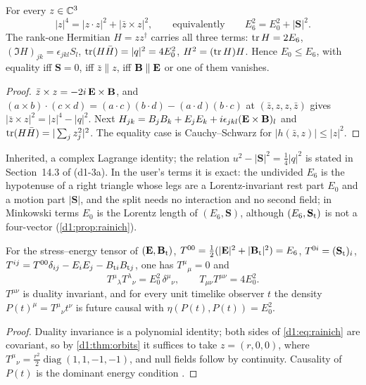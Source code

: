 \begin{proposition}[Differentiation]
\label{d1:prop:lagrange}
For every $z\in\mathbb{C}^3$
\begin{equation}
\label{d1:eq:split}
|z|^4=|z\cdot z|^2+|\bar z\times z|^2,\qquad\text{equivalently}\qquad E_6^2=E_0^2+|\mathbf S|^2 .
\end{equation}
The rank-one Hermitian $H=zz^\dagger$ carries all three terms: $\operatorname{tr} H=2E_6$, $(\Im H)_{jk}=\epsilon_{jkl}S_l$, $\operatorname{tr}(H\bar H)=|q|^2=4E_0^2$, $H^2=(\operatorname{tr} H)H$.
Hence $E_0\le E_6$, with equality iff $\mathbf S=0$, iff $\bar z\parallel z$, iff $\mathbf B\parallel\mathbf E$ or one of them vanishes.
\end{proposition}

\begin{proof}
$\bar z\times z=-2i\,\mathbf E\times\mathbf B$, and $(a\times b)\cdot(c\times d)=(a\cdot c)(b\cdot d)-(a\cdot d)(b\cdot c)$ at $(\bar z,z,z,\bar z)$ gives
$|\bar z\times z|^2=|z|^4-|q|^2$. Next $H_{jk}=B_jB_k+E_jE_k+i\epsilon_{jkl}(\mathbf E\times\mathbf B)_l$ and $\operatorname{tr}(H\bar H)=|\sum_jz_j^2|^2$. The equality case is
Cauchy--Schwarz for $|h(\bar z,z)|\le|z|^2$.
\end{proof}

Inherited, a complex Lagrange identity; the relation $u^2-|\mathbf S|^2=\tfrac14|q|^2$ is stated in Section~14.3 of \cite{ES17} (d1-3a). In the user's
terms it is exact: the undivided $E_6$ is the hypotenuse of a right triangle whose legs are a Lorentz-invariant rest part $E_0$ and a motion part
$|\mathbf S|$, and the split needs no interaction and no second field; in Minkowski terms $E_0$ is the Lorentz length of $(E_6,\mathbf S)$, although
$(E_6,\mathbf S_{\rm t})$ is not a four-vector (\cref{d1:prop:rainich}).

\begin{proposition}
\label{d1:prop:rainich}
For the stress--energy tensor of $(\mathbf E,\mathbf B_{\rm t})$, $T^{00}=\tfrac12(|\mathbf E|^2+|\mathbf B_{\rm t}|^2)=E_6$, $T^{0i}=(\mathbf S_{\rm t})_i$,
$T^{ij}=T^{00}\delta_{ij}-E_iE_j-B_{{\rm t}i}B_{{\rm t}j}$, one has $T^\mu{}_\mu=0$ and
\begin{equation}
\label{d1:eq:rainich}
T^\mu{}_\lambda T^\lambda{}_\nu=E_0^2\,\delta^\mu{}_\nu ,\qquad T_{\mu\nu}T^{\mu\nu}=4E_0^2 .
\end{equation}
$T^{\mu\nu}$ is duality invariant, and for every unit timelike observer $t$ the density $P(t)^\mu=T^\mu{}_\nu t^\nu$ is future causal with
$\eta(P(t),P(t))=E_0^2$.
\end{proposition}

\begin{proof}
Duality invariance is a polynomial identity; both sides of \eqref{d1:eq:rainich} are covariant, so by \cref{d1:thm:orbits} it suffices to take
$z=(r,0,0)$, where $T^\mu{}_\nu=\tfrac{r^2}2\operatorname{diag}(1,1,-1,-1)$, and null fields follow by continuity. Causality of $P(t)$ is the dominant
energy condition \cite{HawkingEllis73}.
\end{proof}

